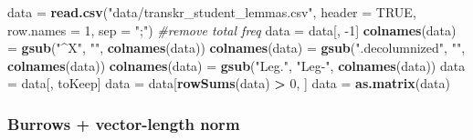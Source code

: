 \documentclass[]{article}
\newenvironment{Shaded}{\begin{snugshade}}{\end{snugshade}}
\newcommand{\CommentTok}[1]{\textcolor[rgb]{0.56,0.35,0.01}{\textit{#1}}}
\newcommand{\DataTypeTok}[1]{\textcolor[rgb]{0.13,0.29,0.53}{#1}}
\newcommand{\DecValTok}[1]{\textcolor[rgb]{0.00,0.00,0.81}{#1}}
\newcommand{\KeywordTok}[1]{\textcolor[rgb]{0.13,0.29,0.53}{\textbf{#1}}}
\newcommand{\NormalTok}[1]{#1}
\newcommand{\OperatorTok}[1]{\textcolor[rgb]{0.81,0.36,0.00}{\textbf{#1}}}
\newcommand{\OtherTok}[1]{\textcolor[rgb]{0.56,0.35,0.01}{#1}}
\newcommand{\StringTok}[1]{\textcolor[rgb]{0.31,0.60,0.02}{#1}}
\begin{document}
\begin{Shaded}
\begin{Highlighting}[]
\NormalTok{data =}\StringTok{ }\KeywordTok{read.csv}\NormalTok{(}\StringTok{"data/transkr_student_lemmas.csv"}\NormalTok{, }\DataTypeTok{header =} \OtherTok{TRUE}\NormalTok{, }\DataTypeTok{row.names =} \DecValTok{1}\NormalTok{, }\DataTypeTok{sep =} \StringTok{";"}\NormalTok{)}
\CommentTok{#remove total freq}
\NormalTok{data =}\StringTok{ }\NormalTok{data[, }\DecValTok{-1}\NormalTok{]}
\KeywordTok{colnames}\NormalTok{(data) =}\StringTok{ }\KeywordTok{gsub}\NormalTok{(}\StringTok{"^X"}\NormalTok{, }\StringTok{""}\NormalTok{, }\KeywordTok{colnames}\NormalTok{(data))}
\KeywordTok{colnames}\NormalTok{(data) =}\StringTok{ }\KeywordTok{gsub}\NormalTok{(}\StringTok{".decolumnized"}\NormalTok{, }\StringTok{""}\NormalTok{, }\KeywordTok{colnames}\NormalTok{(data))}
\KeywordTok{colnames}\NormalTok{(data) =}\StringTok{ }\KeywordTok{gsub}\NormalTok{(}\StringTok{"Leg."}\NormalTok{, }\StringTok{"Leg-"}\NormalTok{, }\KeywordTok{colnames}\NormalTok{(data))}
\NormalTok{data =}\StringTok{ }\NormalTok{data[, toKeep]}
\NormalTok{data =}\StringTok{ }\NormalTok{data[}\KeywordTok{rowSums}\NormalTok{(data) }\OperatorTok{>}\StringTok{ }\DecValTok{0}\NormalTok{, ]}
\NormalTok{data =}\StringTok{ }\KeywordTok{as.matrix}\NormalTok{(data)}
\end{Highlighting}
\end{Shaded}

\hypertarget{burrows-vector-length-norm-5}{%
\subsubsection{Burrows + vector-length
norm}\label{burrows-vector-length-norm-5}}
\end{document}
